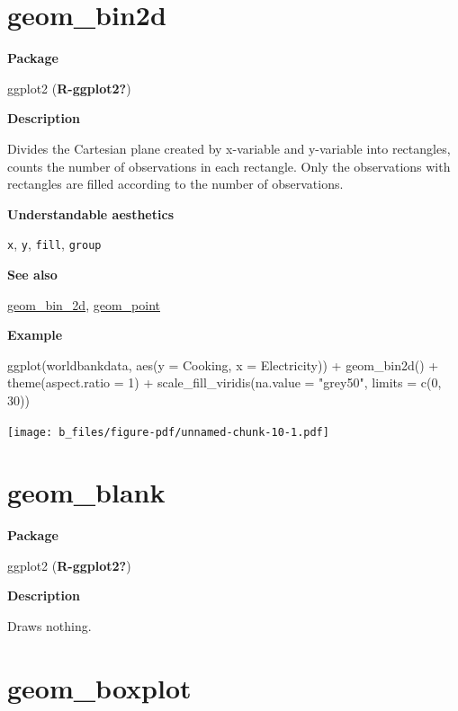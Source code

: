 \documentclass[
  letterpaper,
  DIV=11,
  numbers=noendperiod]{scrreprt}
\newenvironment{Shaded}{\begin{snugshade}}{\end{snugshade}}
\newcommand{\AttributeTok}[1]{\textcolor[rgb]{0.40,0.45,0.13}{#1}}
\newcommand{\DecValTok}[1]{\textcolor[rgb]{0.68,0.00,0.00}{#1}}
\newcommand{\FunctionTok}[1]{\textcolor[rgb]{0.28,0.35,0.67}{#1}}
\newcommand{\NormalTok}[1]{\textcolor[rgb]{0.00,0.23,0.31}{#1}}
\newcommand{\SpecialCharTok}[1]{\textcolor[rgb]{0.37,0.37,0.37}{#1}}
\newcommand{\StringTok}[1]{\textcolor[rgb]{0.13,0.47,0.30}{#1}}
\begin{document}
\section{geom\_bin2d}\label{bin2d}

\textbf{Package}

ggplot2 (\textbf{R-ggplot2?})

\textbf{Description}

Divides the Cartesian plane created by x-variable and y-variable into
rectangles, counts the number of observations in each rectangle. Only
the observations with rectangles are filled according to the number of
observations.

\textbf{Understandable aesthetics}

\texttt{x}, \texttt{y}, \texttt{fill}, \texttt{group}

\textbf{See also}

\hyperref[bin_2d]{geom\_bin\_2d}, \hyperref[point]{geom\_point}

\textbf{Example}

\begin{Shaded}
\begin{Highlighting}[]
\FunctionTok{ggplot}\NormalTok{(worldbankdata, }\FunctionTok{aes}\NormalTok{(}\AttributeTok{y =}\NormalTok{ Cooking, }\AttributeTok{x =}\NormalTok{ Electricity)) }\SpecialCharTok{+}
  \FunctionTok{geom\_bin2d}\NormalTok{() }\SpecialCharTok{+}
  \FunctionTok{theme}\NormalTok{(}\AttributeTok{aspect.ratio =} \DecValTok{1}\NormalTok{) }\SpecialCharTok{+}
  \FunctionTok{scale\_fill\_viridis}\NormalTok{(}\AttributeTok{na.value =} \StringTok{"grey50"}\NormalTok{, }\AttributeTok{limits =} \FunctionTok{c}\NormalTok{(}\DecValTok{0}\NormalTok{, }\DecValTok{30}\NormalTok{))}
\end{Highlighting}
\end{Shaded}

\texttt{[image: b\_files/figure-pdf/unnamed-chunk-10-1.pdf]}

\section{geom\_blank}\label{blank}

\textbf{Package}

ggplot2 (\textbf{R-ggplot2?})

\textbf{Description}

Draws nothing.

\section{geom\_boxplot}\label{boxplot}
\end{document}
